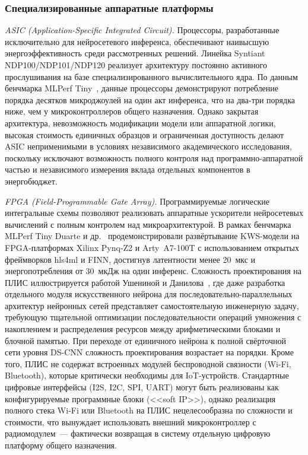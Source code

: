 \subsubsection{Специализированные аппаратные платформы}

\textit{ASIC (Application-Specific Integrated Circuit).} Процессоры,
разработанные исключительно для нейросетевого инференса, обеспечивают
наивысшую энергоэффективность среди рассмотренных решений. Линейка
Syntiant NDP100/NDP101/NDP120 реализует архитектуру постоянно активного
прослушивания на базе специализированного вычислительного ядра. По
данным бенчмарка MLPerf Tiny~\cite{src:5}, данные процессоры
демонстрируют потребление порядка десятков микроджоулей на один акт
инференса, что на два-три порядка ниже, чем у микроконтроллеров общего
назначения. Однако закрытая архитектура, невозможность модификации
модели или аппаратной логики, высокая стоимость единичных образцов и
ограниченная доступность делают ASIC неприменимыми в условиях
независимого академического исследования, поскольку исключают возможность
полного контроля над программно-аппаратной частью и независимого
измерения вклада отдельных компонентов в энергобюджет.

\textit{FPGA (Field-Programmable Gate Array).} Программируемые
логические интегральные схемы позволяют реализовать аппаратные ускорители
нейросетевых вычислений с полным контролем над микроархитектурой. В
рамках бенчмарка MLPerf Tiny Duarte и др.~\cite{src:21}
продемонстрировали развёртывание KWS-модели на FPGA-платформах Xilinx
Pynq-Z2 и Arty~A7-100T с использованием открытых фреймворков hls4ml и
FINN, достигнув латентности менее 20~мкс и энергопотребления от 30~мкДж
на один инференс. Сложность проектирования на ПЛИС иллюстрируется работой
Ушениной и Данилова~\cite{src:25}, где даже разработка отдельного модуля
искусственного нейрона для последовательно-параллельных архитектур
нейронных сетей представляет самостоятельную инженерную задачу,
требующую тщательной оптимизации последовательности операций умножения
с накоплением и распределения ресурсов между арифметическими блоками и
блочной памятью. При переходе от единичного нейрона к полной свёрточной
сети уровня DS-CNN сложность проектирования возрастает на порядки.
Кроме того, ПЛИС не содержат встроенных модулей беспроводной
связности (Wi-Fi, Bluetooth), которые критически необходимы для
IoT-устройств. Стандартные цифровые интерфейсы (I2S, I2C, SPI, UART)
могут быть реализованы как конфигурируемые программные блоки (<<soft IP>>),
однако реализация полного стека Wi-Fi или Bluetooth на ПЛИС
нецелесообразна по сложности и стоимости, что вынуждает использовать
внешний микроконтроллер с радиомодулем~--- фактически возвращая в систему
отдельную цифровую платформу общего назначения.


